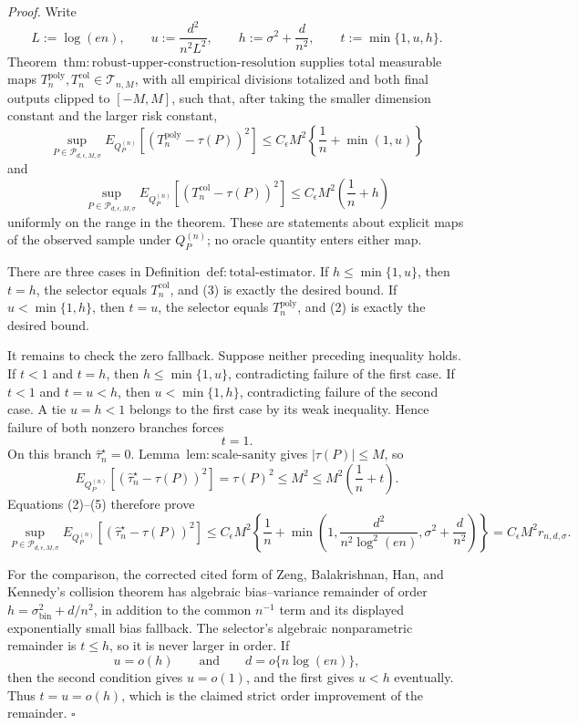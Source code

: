 \textit{Proof.}
Write
\[
 L:=\log(en),\qquad
 u:=\frac{d^2}{n^2L^2},\qquad
 h:=\sigma^2+\frac d{n^2},
 \qquad t:=\min\{1,u,h\}.
\tag{1}
\]
Theorem~\(\mathrm{thm:robust\text{-}upper\text{-}construction\text{-}resolution}\) supplies total measurable maps \(T_n^{\mathrm{poly}},T_n^{\mathrm{col}}\in\mathcal T_{n,M}\), with all empirical divisions totalized and both final outputs clipped to \([-M,M]\), such that, after taking the smaller dimension constant and the larger risk constant,
\[
 \sup_{P\in\mathcal P_{d,\epsilon,M,\sigma}}
 E_{Q_P^{(n)}}[(T_n^{\mathrm{poly}}-\tau(P))^2]
 \le C_\epsilon M^2\left\{\frac1n+\min(1,u)\right\}
\tag{2}
\]
and
\[
 \sup_{P\in\mathcal P_{d,\epsilon,M,\sigma}}
 E_{Q_P^{(n)}}[(T_n^{\mathrm{col}}-\tau(P))^2]
 \le C_\epsilon M^2\left(\frac1n+h\right)
\tag{3}
\]
uniformly on the range in the theorem.  These are statements about explicit maps of the observed sample under \(Q_P^{(n)}\); no oracle quantity enters either map.

There are three cases in Definition~\(\mathrm{def:total\text{-}estimator}\).  If \(h\le\min\{1,u\}\), then \(t=h\), the selector equals \(T_n^{\mathrm{col}}\), and (3) is exactly the desired bound.  If \(u<\min\{1,h\}\), then \(t=u\), the selector equals \(T_n^{\mathrm{poly}}\), and (2) is exactly the desired bound.

It remains to check the zero fallback.  Suppose neither preceding inequality holds.  If \(t<1\) and \(t=h\), then \(h\le\min\{1,u\}\), contradicting failure of the first case.  If \(t<1\) and \(t=u<h\), then \(u<\min\{1,h\}\), contradicting failure of the second case.  A tie \(u=h<1\) belongs to the first case by its weak inequality.  Hence failure of both nonzero branches forces
\[
 t=1.
\tag{4}
\]
On this branch \(\widehat\tau_n^\star=0\).  Lemma~\(\mathrm{lem:scale\text{-}sanity}\) gives \(|\tau(P)|\le M\), so
\[
 E_{Q_P^{(n)}}[(\widehat\tau_n^\star-\tau(P))^2]
 =\tau(P)^2\le M^2
 \le M^2\left(\frac1n+t\right).
\tag{5}
\]
Equations (2)--(5) therefore prove
\[
 \sup_{P\in\mathcal P_{d,\epsilon,M,\sigma}}
 E_{Q_P^{(n)}}[(\widehat\tau_n^\star-\tau(P))^2]
 \le C_\epsilon M^2
 \left\{\frac1n+\min\left(1,
 \frac{d^2}{n^2\log^2(en)},\sigma^2+\frac d{n^2}
 \right)\right\}
 =C_\epsilon M^2r_{n,d,\sigma}.
\tag{6}
\]

For the comparison, the corrected cited form of Zeng, Balakrishnan, Han, and Kennedy's collision theorem has algebraic bias--variance remainder of order \(h=\sigma_{\mathrm{bin}}^2+d/n^2\), in addition to the common \(n^{-1}\) term and its displayed exponentially small bias fallback.  The selector's algebraic nonparametric remainder is \(t\le h\), so it is never larger in order.  If
\[
 u=o(h)
 \qquad\text{and}\qquad d=o\{n\log(en)\},
\tag{7}
\]
then the second condition gives \(u=o(1)\), and the first gives \(u<h\) eventually.  Thus \(t=u=o(h)\), which is the claimed strict order improvement of the remainder. \(\square\)